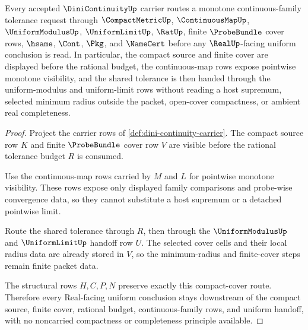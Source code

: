 \begin{theorem}
\label{thm:dini-continuity-compact-finite-cover-route}
Every accepted $\DiniContinuityUp$ carrier routes a monotone continuous-family tolerance request through $\CompactMetricUp$, $\ContinuousMapUp$, $\UniformModulusUp$, $\UniformLimitUp$, $\RatUp$, finite $\ProbeBundle$ cover rows, $\hsame$, $\Cont$, $\Pkg$, and $\NameCert$ before any $\RealUp$-facing uniform conclusion is read. In particular, the compact source and finite cover are displayed before the rational budget, the continuous-map rows expose pointwise monotone visibility, and the shared tolerance is then handed through the uniform-modulus and uniform-limit rows without reading a host supremum, selected minimum radius outside the packet, open-cover compactness, or ambient real completeness.
\end{theorem}
\begin{proof}
Project the carrier rows of \autoref{def:dini-continuity-carrier}. The compact source row $K$ and finite $\ProbeBundle$ cover row $V$ are visible before the rational tolerance budget $R$ is consumed.

Use the continuous-map rows carried by $M$ and $L$ for pointwise monotone visibility. These rows expose only displayed family comparisons and probe-wise convergence data, so they cannot substitute a host supremum or a detached pointwise limit.

Route the shared tolerance through $R$, then through the $\UniformModulusUp$ and $\UniformLimitUp$ handoff row $U$. The selected cover cells and their local radius data are already stored in $V$, so the minimum-radius and finite-cover steps remain finite packet data.

The structural rows $H,C,P,N$ preserve exactly this compact-cover route. Therefore every Real-facing uniform conclusion stays downstream of the compact source, finite cover, rational budget, continuous-family rows, and uniform handoff, with no noncarried compactness or completeness principle available.
\end{proof}

